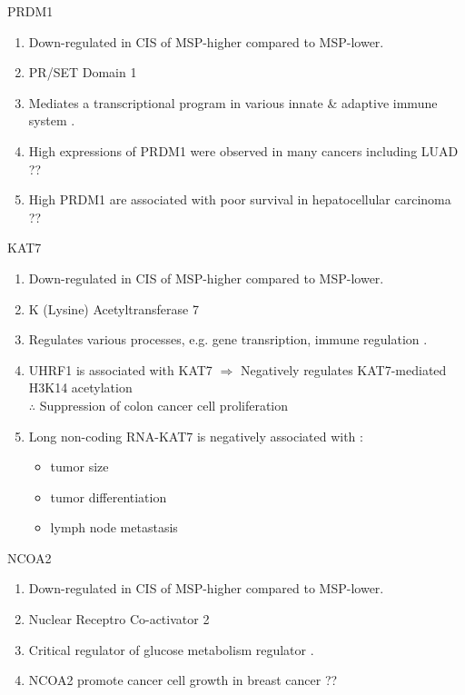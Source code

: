 \documentclass{beamer}
\begin{document}
\begin{frame}[allowframebreaks]
        \begin{block}{PRDM1}
            \begin{enumerate}
                \item Down-regulated in CIS of MSP-higher compared to MSP-lower.
                \item PR/SET Domain 1
                \item Mediates a transcriptional program in various innate \& adaptive immune system \cite{PRDM1-1}.
                \item High expressions of PRDM1 were observed in many cancers including LUAD \cite{PRDM1-2} ??
                \item High PRDM1 are associated with poor survival in hepatocellular carcinoma \cite{PRDM1-3} ??
            \end{enumerate}
        \end{block}

        \begin{block}{KAT7}
            \begin{enumerate}
                \item Down-regulated in CIS of MSP-higher compared to MSP-lower.
                \item K (Lysine) Acetyltransferase 7
                \item Regulates various processes, e.g. gene transription, immune regulation \cite{KAT7-1}.
                \item UHRF1 is associated with KAT7 $\Rightarrow$ Negatively regulates KAT7-mediated H3K14 acetylation \\
                    $\therefore$ Suppression of colon cancer cell proliferation \cite{KAT7-2}
                \item Long non-coding RNA-KAT7 is negatively associated with \cite{KAT7-3}:
                \begin{itemize}
                    \item tumor size
                    \item tumor differentiation
                    \item lymph node metastasis
                \end{itemize}
            \end{enumerate}
        \end{block}

         \begin{block}{NCOA2}
            \begin{enumerate}
                \item Down-regulated in CIS of MSP-higher compared to MSP-lower.
                \item Nuclear Receptro Co-activator 2
                \item Critical regulator of glucose metabolism regulator \cite{NCOA2-1}.
                \item NCOA2 promote cancer cell growth in breast cancer \cite{NCOA2-2} ??
            \end{enumerate}
        \end{block}
    \end{frame}
\end{document}
